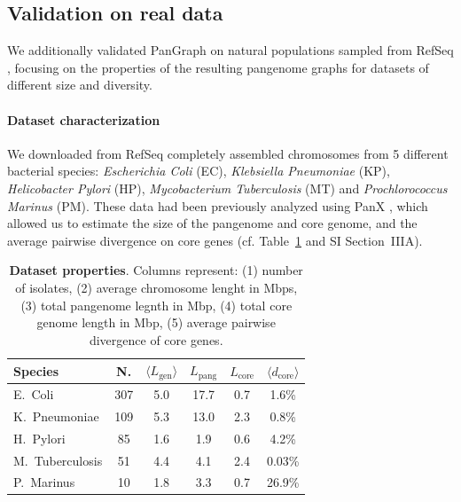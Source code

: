\documentclass[aps,rmp,reprint,superscriptaddress,notitlepage,10pt]{revtex4-1}
\newcommand{\avg}[1]{\langle #1 \rangle}
\newcommand{\Lcore}{L_\text{core}}
\newcommand{\Lpang}{L_\text{pang}}
\newcommand{\Lgen}{L_\text{gen}}
\newcommand{\dcore}{\langle d_\text{core} \rangle}
\begin{document}
\subsection{Validation on real data}

We additionally validated PanGraph on natural populations sampled from RefSeq \cite{o2016reference}, focusing on the properties of the resulting pangenome graphs for datasets of different size and diversity.

\paragraph*{Dataset characterization}

We downloaded from RefSeq \cite{o2016reference} completely assembled chromosomes from 5 different bacterial species: \textit{Escherichia Coli} (EC), \textit{Klebsiella Pneumoniae} (KP), \textit{Helicobacter Pylori} (HP), \textit{Mycobacterium Tuberculosis} (MT) and \textit{Prochlorococcus Marinus} (PM). These data had been previously analyzed using PanX \cite{ding2018panx}, which allowed us to estimate the size of the pangenome and core genome, and the average pairwise divergence on core genes (cf. Table~\ref{table:panx-dataset} and SI Section~IIIA).



\begin{table}[h]
    \setlength{\tabcolsep}{6pt}
    \begin{tabular}{l c c c c c }
        \hline\hline
        Species         & N.  & $\avg{\Lgen}$ & $\Lpang$ & $\Lcore$ & $\dcore$ \\
        \hline
        E.~Coli         & 307 & 5.0           & 17.7     & 0.7      & 1.6\%    \\
        K.~Pneumoniae   & 109 & 5.3           & 13.0     & 2.3      & 0.8\%    \\
        H.~Pylori       & 85  & 1.6           & 1.9      & 0.6      & 4.2\%    \\
        M.~Tuberculosis & 51  & 4.4           & 4.1      & 2.4      & 0.03\%   \\
        P.~Marinus      & 10  & 1.8           & 3.3      & 0.7      & 26.9\%   \\
        \hline
    \end{tabular}
    \caption{{\bf Dataset properties}. Columns represent:
        (1) number of isolates,
        (2) average chromosome lenght in Mbps,
        (3) total pangenome legnth in Mbp,
        (4) total core genome length in Mbp,
        (5) average pairwise divergence of core genes.
    }
    \label{table:panx-dataset}
\end{table}
\end{document}
